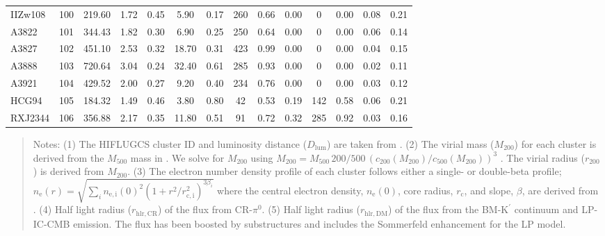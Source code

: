 \documentclass[10pt,aps,pra,reprint,amsmath,amsfonts,amssymb,showpacs,nofootinbib,floatfix]{revtex4-1}
\newcommand{\rmn}{\mathrm}
\newcommand{\Kp}{\rmn{K}^\prime}
\newcommand{\vst}{\vspace{-0.14mm}}
\newcommand{\rvir}{r_{200}}
\newcommand{\mvir}{M_{200}}
\begin{document}
\begin{table}
\begin{minipage}{2.0\columnwidth}
\begin{tabular}{l  c c c c c c c c c c c c c}
IIZw108  & 100 & 219.60 &   1.72 &   0.45 &   5.90 &   0.17 & 260 &   0.66 &   0.00 &    0 &   0.00 &   0.08 &   0.21 \vst \\
A3822    & 101 & 344.43 &   1.82 &   0.30 &   6.90 &   0.25 & 250 &   0.64 &   0.00 &    0 &   0.00 &   0.06 &   0.14 \vst \\
A3827    & 102 & 451.10 &   2.53 &   0.32 &  18.70 &   0.31 & 423 &   0.99 &   0.00 &    0 &   0.00 &   0.04 &   0.15 \vst \\
A3888    & 103 & 720.64 &   3.04 &   0.24 &  32.40 &   0.61 & 285 &   0.93 &   0.00 &    0 &   0.00 &   0.02 &   0.11 \vst \\
A3921    & 104 & 429.52 &   2.00 &   0.27 &   9.20 &   0.40 & 234 &   0.76 &   0.00 &    0 &   0.00 &   0.03 &   0.12 \vst \\
HCG94    & 105 & 184.32 &   1.49 &   0.46 &   3.80 &   0.80 &  42 &   0.53 &   0.19 &  142 &   0.58 &   0.06 &   0.21 \vst \\
RXJ2344  & 106 & 356.88 &   2.17 &   0.35 &  11.80 &   0.51 &  91 &   0.72 &   0.32 &  285 &   0.92 &   0.03 &   0.16 \vst \\
\hline
\hline
\end{tabular}
\begin{quote}
  Notes: 
  (1) The HIFLUGCS cluster ID and luminosity distance
  ($D_\rmn{lum}$) are taken from \cite{2002ApJ...567..716R}.
  (2) The virial mass ($\mvir$) for each cluster is derived from the $M_{500}$ 
  mass in \cite{2007A&A...466..805C}. We solve for $\mvir$ using 
  $\mvir=M_{500}\,200/500\,(c_{200}(\mvir)/c_{500}(\mvir))^3$ \cite{2005RvMP...77..207V}. 
  The virial radius ($\rvir$) is derived from $\mvir$.
  (3) The electron number density profile of each cluster follows either a single- or double-beta profile;
  $n_\rmn{e}(r) = \sqrt{\sum_i n_\rmn{e,i}(0)^2(1+r^2/r_\rmn{c,i}^2)^{3\beta_i}}$
  where the central electron density, $n_\rmn{e}(0)$, core radius, $r_\rmn{c}$, and slope, $\beta$, are derived from
  \cite{2007A&A...466..805C}.
  (4) Half light radius ($r_\rmn{hlr,CR}$) of the flux from CR-$\pi^0$.
  (5) Half light radius ($r_\rmn{hlr,DM}$) of the flux from the BM-$\Kp$ 
  continuum and LP-IC-CMB emission. The flux has been
  boosted by substructures and includes the Sommerfeld enhancement for the LP model. 
  \end{quote}
\end{minipage}
\end{table} 
\end{document}
